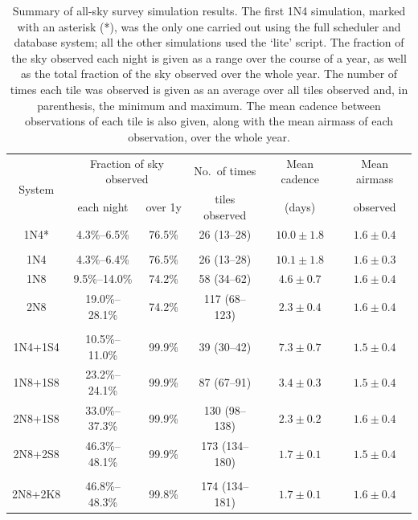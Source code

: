 \begin{colsection}
\begin{table}[t]
    \begin{center}
        \begin{tabular}{c|cc|c|c|c} %
            \multirow{2}{*}{System} &
            \multicolumn{2}{c|}{Fraction of sky observed} &
            No.\ of times &
            Mean cadence &
            {\small Mean airmass}
            \\
            &
            each night &
            over 1y &
            tiles observed &
            (days) &
            observed
            \\
            \midrule
            1N4* & 4.3\%--6.5\% & 76.5\% & 26 (13--28) & $10.0\pm1.8$ & $1.6\pm0.4$ \\
            &&&&&\\
            1N4 & 4.3\%--6.4\% & 76.5\% & 26 (13--28) & $10.1\pm1.8$ & $1.6\pm0.3$ \\
            1N8 & 9.5\%--14.0\% & 74.2\% & 58 (34--62) & $4.6\pm0.7$ & $1.6\pm0.4$ \\
            2N8 & 19.0\%--28.1\% & 74.2\% & 117 (68--123) & $2.3\pm0.4$ & $1.6\pm0.4$ \\
            &&&&&\\
            1N4+1S4 & 10.5\%--11.0\% & 99.9\% & 39 (30--42) & $7.3\pm0.7$ & $1.5\pm0.4$ \\
            1N8+1S8 & 23.2\%--24.1\% & 99.9\% & 87 (67--91) & $3.4\pm0.3$ & $1.5\pm0.4$ \\
            2N8+1S8 & 33.0\%--37.3\% & 99.9\% & 130 (98--138) & $2.3\pm0.2$ & $1.6\pm0.4$ \\
            2N8+2S8 & 46.3\%--48.1\% & 99.9\% & 173 (134--180) & $1.7\pm0.1$ & $1.5\pm0.4$ \\
            &&&&&\\
            2N8+2K8 & 46.8\%--48.3\% & 99.8\% & 174 (134--181) & $1.7\pm0.1$ & $1.6\pm0.4$ \\
        \end{tabular}
    \end{center}
    \caption[All-sky survey simulation results summary table]{
        Summary of all-sky survey simulation results. The first 1N4 simulation, marked with an asterisk (*), was the only one carried out using the full scheduler and database system; all the other simulations used the `lite' script. The fraction of the sky observed each night is given as a range over the course of a year, as well as the total fraction of the sky observed over the whole year. The number of times each tile was observed is given as an average over all tiles observed and, in parenthesis, the minimum and maximum. The mean cadence between observations of each tile is also given, along with the mean airmass of each observation, over the whole year.
    }\label{tab:survey_sim_results}
\end{table}

\end{colsection}

